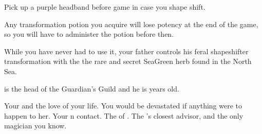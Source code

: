 \documentclass[char]{NeptuneBall}
\begin{document}
\begin{itemz}[Notes]
  \item Pick up a purple headband before game in case you shape shift.
  \item Any transformation potion you acquire will lose potency at the end of the game, so you will have to administer the potion before then.
\end{itemz}

\begin{itemz}[Trivia]
	\item While you have never had to use it, your father controls his feral shapeshifter transformation with the the rare and secret SeaGreen herb found in the North Sea.
  \item \cKratos{} is the head of the Guardian's Guild and he is \cKratos{\MYnumber} years old.
\end{itemz}

\begin{contacts}
  \contact{\cQueen{}} Your \cQueen{\spouse} and the love of your life. You would be devastated if anything were to happen to her.
  \contact{\cSpy{}} Your \pPacifica{}n contact.
  \contact{\cKing{}} The \cKing{\King} of \pAtlantis{}.
  \contact{\cManta{}} The \cKing{\King}'s closest advisor, and the only magician you know.
\end{contacts}
\end{document}
